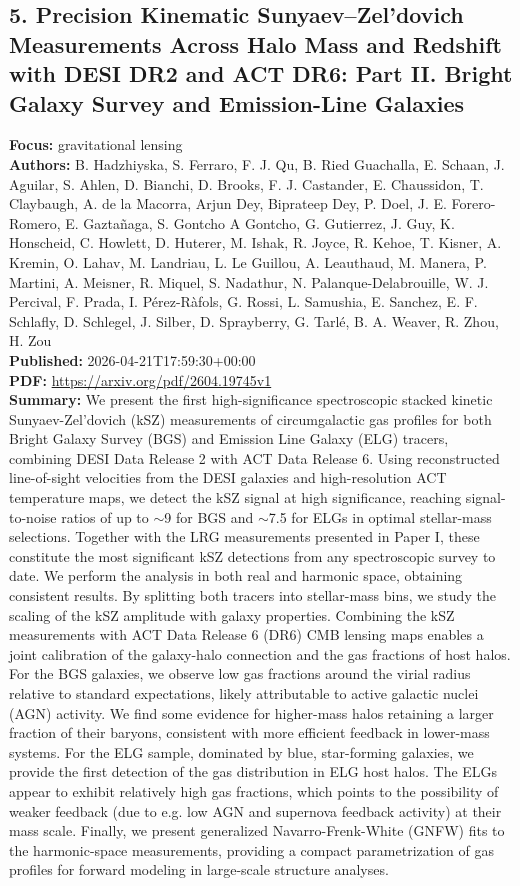 \documentclass[11pt]{article}
\begin{document}
\subsection*{5. Precision Kinematic Sunyaev--Zel'dovich Measurements Across Halo Mass and Redshift with DESI DR2 and ACT DR6: Part II. Bright Galaxy Survey and Emission-Line Galaxies}
\textbf{Focus:} gravitational lensing\\
\textbf{Authors:} B. Hadzhiyska, S. Ferraro, F. J. Qu, B. Ried Guachalla, E. Schaan, J. Aguilar, S. Ahlen, D. Bianchi, D. Brooks, F. J. Castander, E. Chaussidon, T. Claybaugh, A. de la Macorra, Arjun Dey, Biprateep Dey, P. Doel, J. E. Forero-Romero, E. Gaztañaga, S. Gontcho A Gontcho, G. Gutierrez, J. Guy, K. Honscheid, C. Howlett, D. Huterer, M. Ishak, R. Joyce, R. Kehoe, T. Kisner, A. Kremin, O. Lahav, M. Landriau, L. Le Guillou, A. Leauthaud, M. Manera, P. Martini, A. Meisner, R. Miquel, S. Nadathur, N. Palanque-Delabrouille, W. J. Percival, F. Prada, I. Pérez-Ràfols, G. Rossi, L. Samushia, E. Sanchez, E. F. Schlafly, D. Schlegel, J. Silber, D. Sprayberry, G. Tarlé, B. A. Weaver, R. Zhou, H. Zou\\
\textbf{Published:} 2026-04-21T17:59:30+00:00\\
\textbf{PDF:} \href{https://arxiv.org/pdf/2604.19745v1}{https://arxiv.org/pdf/2604.19745v1}\\
\textbf{Summary:}
We present the first high-significance spectroscopic stacked kinetic Sunyaev-Zel'dovich (kSZ) measurements of circumgalactic gas profiles for both Bright Galaxy Survey (BGS) and Emission Line Galaxy (ELG) tracers, combining DESI Data Release 2 with ACT Data Release 6. Using reconstructed line-of-sight velocities from the DESI galaxies and high-resolution ACT temperature maps, we detect the kSZ signal at high significance, reaching signal-to-noise ratios of up to $\sim$9 for BGS and $\sim$7.5 for ELGs in optimal stellar-mass selections. Together with the LRG measurements presented in Paper I, these constitute the most significant kSZ detections from any spectroscopic survey to date. We perform the analysis in both real and harmonic space, obtaining consistent results. By splitting both tracers into stellar-mass bins, we study the scaling of the kSZ amplitude with galaxy properties. Combining the kSZ measurements with ACT Data Release 6 (DR6) CMB lensing maps enables a joint calibration of the galaxy-halo connection and the gas fractions of host halos. For the BGS galaxies, we observe low gas fractions around the virial radius relative to standard expectations, likely attributable to active galactic nuclei (AGN) activity. We find some evidence for higher-mass halos retaining a larger fraction of their baryons, consistent with more efficient feedback in lower-mass systems. For the ELG sample, dominated by blue, star-forming galaxies, we provide the first detection of the gas distribution in ELG host halos. The ELGs appear to exhibit relatively high gas fractions, which points to the possibility of weaker feedback (due to e.g. low AGN and supernova feedback activity) at their mass scale. Finally, we present generalized Navarro-Frenk-White (GNFW) fits to the harmonic-space measurements, providing a compact parametrization of gas profiles for forward modeling in large-scale structure analyses.
\end{document}
